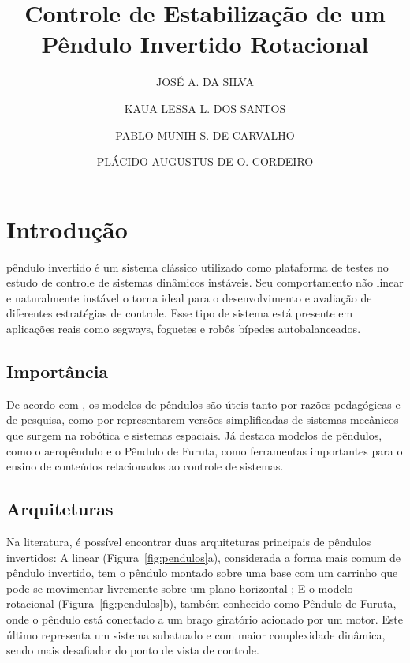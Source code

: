 \documentclass[9pt,a4paper,twocolumn,twoside]{tau-class/tau}
\title{Controle de Estabilização de um Pêndulo Invertido Rotacional}
\author[a,1]{JOSÉ A. DA SILVA}
\author[b,2]{KAUA LESSA L. DOS SANTOS }
\author[c,3]{PABLO MUNIH S. DE CARVALHO}
\author[d,4]{PLÁCIDO AUGUSTUS DE O. CORDEIRO}
\affil[a]{Engenharia da Computação, Universidade Federal de Alagoas}
\affil[b]{Engenharia da Computação, Universidade Federal de Alagoas}
\affil[c]{Engenharia da Computação, Universidade Federal de Alagoas}
\begin{document}
		
    \maketitle 
    \thispagestyle{firststyle} 
    \tauabstract 
    

\section{Introdução}
     pêndulo invertido é um sistema clássico utilizado como plataforma de testes no estudo de controle de sistemas dinâmicos instáveis. 
    Seu comportamento não linear e naturalmente instável o torna ideal para o desenvolvimento e avaliação de diferentes estratégias de controle. 
    Esse tipo de sistema está presente em aplicações reais como segways, foguetes e robôs bípedes autobalanceados.

    \subsection{Importância}

    De acordo com \cite{casas2024}, os modelos de pêndulos são úteis tanto por razões pedagógicas e de pesquisa, como por
    representarem versões simplificadas de sistemas mecânicos que surgem na robótica e sistemas espaciais. Já \cite{breganon2021}
    destaca modelos de pêndulos, como o aeropêndulo e o Pêndulo de Furuta, como ferramentas importantes para o ensino de conteúdos
    relacionados ao controle de sistemas. 

    \subsection{Arquiteturas}

    Na literatura, é possível encontrar duas arquiteturas principais de pêndulos invertidos:
    A linear (Figura~\ref{fig:pendulos}a), considerada a forma mais comum de pêndulo invertido, tem o pêndulo montado sobre uma base com um carrinho
    que pode se movimentar livremente sobre um plano horizontal \cite{diao2016}; E o modelo rotacional (Figura~\ref{fig:pendulos}b), também conhecido
    como Pêndulo de Furuta, onde o pêndulo está conectado a um braço giratório acionado por um motor. Este último representa 
    um sistema subatuado e com maior complexidade dinâmica, sendo mais desafiador do ponto de vista de controle.
\end{document}
